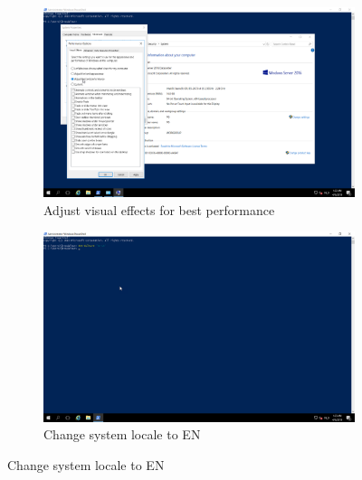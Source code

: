 \begin{figure}[!htb]\ContinuedFloat
    \begin{subfigure}{0.5\textwidth}
        \captionsetup{width=0.8\linewidth}
        \includegraphics[width=0.9\linewidth]{img/Methodologie/Precondition2.png}
        \centering
        \caption{Adjust visual effects for best performance}
    \end{subfigure}
    \begin{subfigure}{0.5\textwidth}
        \captionsetup{width=0.8\linewidth}
        \includegraphics[width=0.9\linewidth]{img/Methodologie/Precondition3.png} 
        \centering
        \caption{Change system locale to EN}
    \end{subfigure}
\end{figure}

